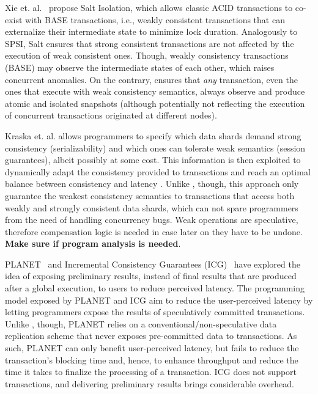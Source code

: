 Xie et. al.~\cite{xie2014salt} propose Salt Isolation, which allows classic ACID transactions to co-exist with BASE transactions, i.e., weakly consistent transactions that can externalize their intermediate state to minimize lock duration. Analogously to SPSI, Salt ensures that strong consistent transactions are not affected by the execution of weak consistent ones. Though, weakly consistency transactions (BASE) may observe the intermediate states of each other, which raises concurrent anomalies. On the contrary,  \specula ensures that \textit{any} transaction, even the ones that execute with weak consistency semantics, always observe and produce atomic and isolated snapshots (although potentially not reflecting the execution of concurrent transactions originated at different nodes).

Kraska et. al. allows programmers to specify which data shards demand strong consistency (serializability) and which ones can tolerate weak semantics (session guarantees), albeit possibly at some cost. This information is then exploited to dynamically adapt the consistency provided to transactions and reach an optimal balance between consistency and latency \cite{kraska2009consistency}. Unlike \specula, though, this approach only guarantee the weakest consistency semantics to transactions that access both weakly and strongly consistent data shards, which can not spare programmers from the need of handling concurrency bugs. Weak operations are speculative, therefore compensation logic is needed in case later on they have to be undone. \textbf{Make sure if program analysis is needed}.

PLANET~\cite{pang2014planet} and Incremental Consistency Guarantees (ICG)~\cite{icg} have explored the idea of exposing preliminary results, instead of final results that are produced after a global execution, to users to reduce perceived latency. The programming model exposed by PLANET and ICG aim to reduce the user-perceived latency by letting programmers expose the results of speculatively committed transactions. Unlike \specula, though, PLANET relies on a conventional/non-speculative data replication scheme that  never exposes pre-committed data to transactions. As such, PLANET can only benefit user-perceived latency, but fails to reduce the transaction's blocking time and, hence, to enhance throughput and reduce the time it takes to finalize the processing of a transaction. ICG does not support transactions, and delivering preliminary results brings considerable overhead. 

